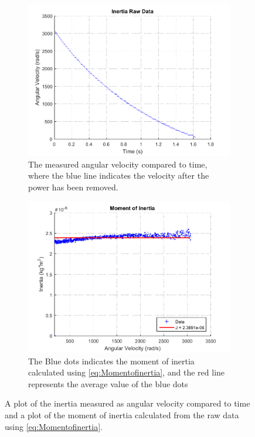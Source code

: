 \begin{figure}[H]
  \setcounter{subfigure}{0}
  \centering
  \begin{subfigure}{0.45\textwidth}
    \centering
    \includegraphics[width=1.1\linewidth]{figures/inertiaRawData.pdf}
    \caption{The measured angular velocity compared to time, where the blue line indicates the velocity after the power has been removed.}
    \label{inertiaRawData}
  \end{subfigure}
  \begin{subfigure}{0.45\textwidth}
    \centering
    \includegraphics[width=1.1\linewidth]{figures/momentOfInertia.pdf}
    \caption{The Blue dots indicates the moment of inertia calculated using \eqref{eq:Momentofinertia}, and the red line represents the average value of the blue dots}
  	\label{momentOfInertia}
  \end{subfigure}
  \caption{A plot of the inertia measured as angular velocity compared to time and a plot of the moment of inertia calculated from the raw data using \eqref{eq:Momentofinertia}.}
  \label{yo}
\end{figure}

